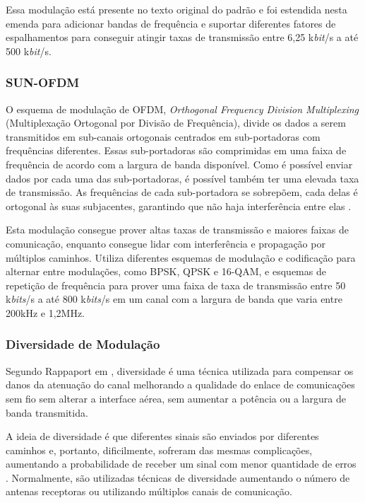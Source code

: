 Essa modulação está presente no texto original do padrão e foi estendida nesta emenda para adicionar bandas de frequência e suportar diferentes fatores de espalhamentos para conseguir atingir taxas de transmissão entre 6,25 k\emph{bit}/s a até 500 k\emph{bit}/s.

\subsubsection{SUN-OFDM}
O esquema de modulação de OFDM, \emph{Orthogonal Frequency Division Multiplexing} (Multiplexação Ortogonal por Divisão de Frequência), divide os dados a serem transmitidos em sub-canais ortogonais centrados em  sub-portadoras com frequências diferentes. Essas sub-portadoras são comprimidas em uma faixa de frequência de acordo com a largura de banda disponível. Como é possível enviar dados por cada uma das sub-portadoras, é possível também ter uma elevada taxa de transmissão. As frequências de cada sub-portadora se sobrepõem, cada delas é ortogonal às suas subjacentes, garantindo que não haja interferência entre elas \cite{rappaport2009}\cite{goldsmith2005wireless}.

Esta modulação consegue prover altas taxas de transmissão e maiores faixas de comunicação, enquanto consegue lidar com interferência e propagação por múltiplos caminhos. Utiliza diferentes esquemas de modulação e codificação para alternar entre modulações, como BPSK, QPSK e 16-QAM, e esquemas de repetição de frequência para prover uma faixa de taxa de transmissão entre 50 k\emph{bits}/s a até 800 k\emph{bits}/s em um canal com a largura de banda que varia entre 200kHz e 1,2MHz.

\subsubsection*{Diversidade de Modulação}
Segundo Rappaport em \cite{rappaport2009}, diversidade é uma técnica utilizada para compensar os danos da atenuação do canal melhorando a qualidade do enlace de comunicações sem fio sem alterar a interface aérea, sem aumentar a potência ou a largura de banda transmitida.

A ideia de diversidade é que diferentes sinais são enviados por diferentes caminhos e, portanto, dificilmente, sofreram das mesmas complicações, aumentando a probabilidade de receber um sinal com menor quantidade de erros \cite{goldsmith2005wireless}. Normalmente, são utilizadas técnicas de diversidade aumentando o número de antenas receptoras ou utilizando múltiplos canais de comunicação.

